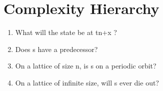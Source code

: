 \documentclass[]{article}
\begin{document}
\section{Complexity Hierarchy}

\begin{enumerate}
	\item What will the state be at tn+x ?
	\item Does s have a predecessor?
	\item On a lattice of size n, is s on a periodic orbit?
	\item On a lattice of infinite size, will s ever die out?
	
\end{enumerate}




\end{document}
